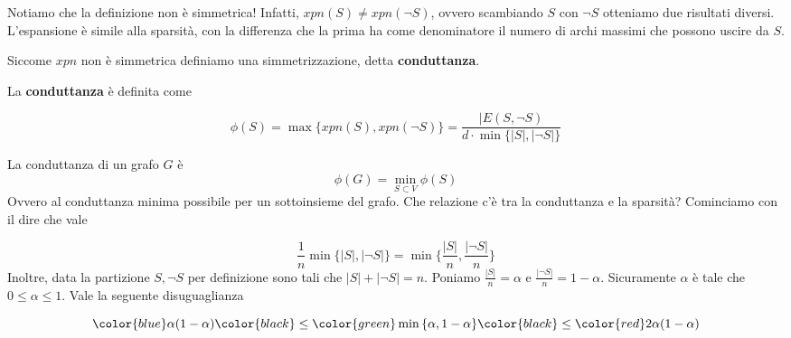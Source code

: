 \documentclass[12pt]{report}
\begin{document}
\noindent 
Notiamo che la definizione non è simmetrica! Infatti, $xpn(S) \neq xpn(\neg S)$, ovvero scambiando $S$ con $\neg S$ otteniamo due risultati diversi. L'espansione è simile alla sparsità, con la differenza che la prima ha come denominatore il numero di archi massimi che possono uscire da $S$. 

Siccome $xpn$ non è simmetrica definiamo una simmetrizzazione, detta \textbf{conduttanza}.

\begin{defi}
    La \textbf{conduttanza} è definita come 

    $$\phi(S) = \max{\{xpn(S),xpn(\neg S)\}} = \frac{|E(S,\neg S)}{d \cdot \min{ \{|S|, |\neg S| \}}}$$
\end{defi}

\noindent 
La conduttanza di un grafo $G$ è 
$$\phi(G) = \min_{S \subset V} \phi(S)$$
Ovvero al conduttanza minima possibile per un sottoinsieme del grafo.
Che relazione c'è tra la conduttanza e la sparsità? Cominciamo con il dire che vale

$$\frac{1}{n} \min{\{|S|,|\neg S|\}} = \min{\{\frac{|S|}{n},\frac{|\neg S|}{n}\}}$$
Inoltre, data la partizione $S,\neg S$ per definizione sono tali che $|S| + |\neg S| = n$. Poniamo $\frac{|S|}{n} = \alpha$ e $\frac{|\neg S |}{n} = 1 - \alpha$. Sicuramente $\alpha$ è tale che $0 \leq \alpha \leq 1$. Vale la seguente disuguaglianza

$$\color{blue} \alpha(1-\alpha) \color{black} \leq \color{green}  \min{\{\alpha,1-\alpha\}} \color{black} \leq \color{red} 2 \alpha(1- \alpha)$$
\end{document}
